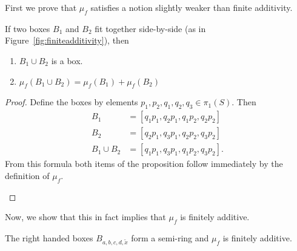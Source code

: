 First we prove that $\mu_f$ satisfies a notion slightly weaker than finite additivity.

\begin{proposition}
  If two boxes $B_1$ and $B_2$ fit together side-by-side (as in Figure~\ref{fig:finiteadditivity}), then
  \begin{enumerate}
      \item $B_1 \cup B_2$ is a box.
      \item $\mu_f(B_1 \cup B_2) = \mu_f(B_1) + \mu_f(B_2)$
  \end{enumerate}
  \label{prop:sidebyside}
\end{proposition}

\begin{proof}
  Define the boxes by elements $p_1,p_2,q_1,q_2,q_3 \in \pi_1(S)$.
  Then
  \begin{align*}
    B_1 &= [q_1 p_1, q_2 p_1, q_1 p_2, q_2 p_2]\\
    B_2 &= [q_2 p_1, q_3 p_1, q_2 p_2, q_3 p_2]\\
    B_1 \cup B_2 &= [q_1 p_1, q_3 p_1, q_1 p_2, q_3 p_2].
  \end{align*}
  From this formula both items of the proposition follow immediately by the definition of $\mu_f$. \qedhere

  \begin{figure}
\end{figure}
\end{proof}

Now, we show that this in fact implies that $\mu_f$ is finitely additive.

\begin{proposition}
\label{prop:RHsemiring}
The right handed boxes $B_{a,b,c,d,\tilde{x}}$ form a semi-ring and $\mu_f$ is finitely additive.
\end{proposition}

